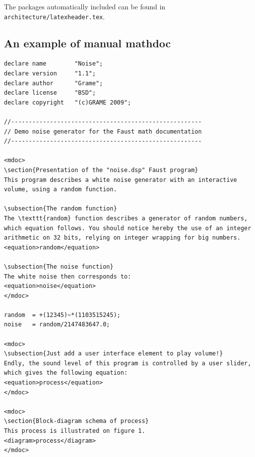 \documentclass[a4paper]{book}
\begin{document}
The \latex packages automatically included can be found in \lstinline!architecture/latexheader.tex!.

\subsection{An example of manual mathdoc}
\label{sec:ex-mathdoc}

\footnotesize
\begin{lstlisting}
declare name 		"Noise";
declare version 	"1.1";
declare author 		"Grame";
declare license 	"BSD";
declare copyright 	"(c)GRAME 2009";

//------------------------------------------------------
// Demo noise generator for the Faust math documentation
//------------------------------------------------------

<mdoc>
\section{Presentation of the "noise.dsp" Faust program}
This program describes a white noise generator with an interactive volume, using a random function.

\subsection{The random function}
The \texttt{random} function describes a generator of random numbers, which equation follows. You should notice hereby the use of an integer arithmetic on 32 bits, relying on integer wrapping for big numbers.
<equation>random</equation>

\subsection{The noise function}
The white noise then corresponds to:
<equation>noise</equation>
</mdoc>

random  = +(12345)~*(1103515245);
noise   = random/2147483647.0;

<mdoc>
\subsection{Just add a user interface element to play volume!}
Endly, the sound level of this program is controlled by a user slider, which gives the following equation: 
<equation>process</equation>
</mdoc>

<mdoc>
\section{Block-diagram schema of process}
This process is illustrated on figure 1.
<diagram>process</diagram>
</mdoc>


\end{lstlisting}
\end{document}
